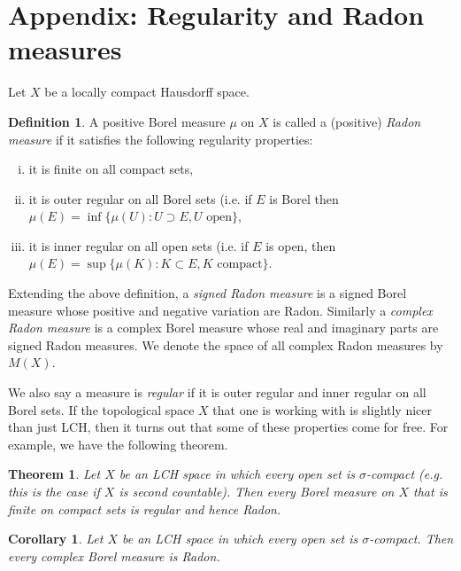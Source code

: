 \documentclass[a4paper,11pt,twoside]{amsart}
\let\vec\mathbf
\newcommand{\R}{\mathbb{R}}
\newtheorem*{theorem}{Theorem}
\newtheorem*{corollary}{Corollary}
\theoremstyle{definition}
\newtheorem*{definition}{Definition}
\begin{document}


\section{Appendix: Regularity and Radon measures}
Let $X$ be a locally compact Hausdorff space.
\begin{definition}
A positive Borel measure $\mu$ on $X$ is called a (positive) \emph{Radon measure} if it satisfies the following regularity properties:
\begin{enumerate}[(i)]
    \item it is finite on all compact sets,
    \item it is outer regular on all Borel sets (i.e. if $E$ is Borel then $\mu(E) = \inf\{\mu(U) \colon U \supset E, U\text{ open}\}$,
    \item it is inner regular on all open sets (i.e. if $E$ is open, then $\mu(E)= \sup\{\mu(K)\colon K \subset E, K\text{ compact}\}.$
\end{enumerate}
\end{definition}

Extending the above definition, a \emph{signed Radon measure} is a signed Borel measure whose positive and negative variation are Radon. Similarly a \emph{complex Radon measure} is a complex Borel measure whose real and imaginary parts are signed Radon measures. We denote the space of all complex Radon measures by $M(X).$

We also say a measure is \emph{regular} if it is outer regular and inner regular on all Borel sets.  If the topological space $X$ that one is working with is slightly nicer than just LCH, then it turns out that some of these properties come for free. For example, we have the following theorem.

\begin{theorem}
Let $X$ be an LCH space in which every open set is $\sigma$-compact (e.g. this is the case if $X$ is second countable). Then every Borel measure on $X$ that is finite on compact sets is regular and hence Radon.
\end{theorem}

\begin{corollary}
Let $X$ be an LCH space in which every open set is $\sigma$-compact. Then every complex Borel measure is Radon.
\end{corollary}
\end{document}
